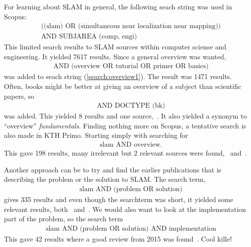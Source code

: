 For learning about SLAM in general, the following seach string was used in Scopus:
\begin{align}
    \label{search:overview1}
    &\text{((slam) OR (simultaneous near localization near mapping))}\nonumber \\
    &\text{AND SUBJAREA (comp, engi)}
\end{align}
This limited search results to SLAM sources within computer sciense and
engineering. It yielded 7617 results. Since a general overview was wanted, 
\begin{align}
    \label{search:overview2}
    &\text{AND (overview OR tutorial OR primer OR basics)}
\end{align}
was added to seach string (\ref{search:overview1}). The result was 1471 results.
Often, books might be better at giving an overview of a subject than scientific
papers, so
\begin{align}
    \label{search:overview3}
    &\text{AND DOCTYPE (bk)}
\end{align}
was added. This yielded 8 results and one source,~\cite{Kernbach20131}. It also
yielded a synonym to ``overview'' \textit{fundamentals}. 
Finding nothing more on Scopus, a tentative search is also made in KTH Primo.
Starting  simply with searching for
\begin{align}
    \label{search:overview4}
    &\text{slam AND overview}.
\end{align}
This gave 198 results, many irrelevant but 2 relevant sources were
found,~\cite{Frese2010} and~\cite{5769022}.

Another approach can be to try and find the earlier publications that is describing the
problem or the solution to SLAM\@. The search term,
\begin{align}
    \label{search:overview5}
    &\text{slam AND (problem OR solution)} 
\end{align}
gives 335 results and even though the searchterm was short, it yielded some
relevant results, both~\cite{938381} and~\cite{844732}. We would also want to look at the implementation part of the problem, so the search term
\begin{align}
    \label{search:overview6}
    &\text{slam AND (problem OR solution) AND implementation} 
\end{align}
This gave 42 results where a good review from 2015 was found~\cite{7482163}. Cool kille!
